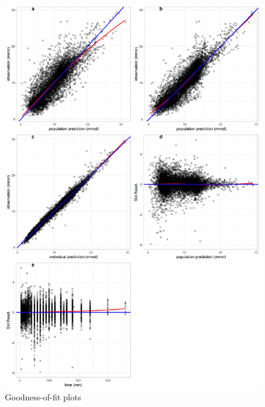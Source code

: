 \documentclass[utf8]{frontiersSCNS} %
\begin{document}
\begin{figure}[h!]
\begin{center}
\includegraphics[width=15cm]{comb.PNG}
\end{center}
\caption{Goodness-of-fit plots}
\label{fig: fittings}
\end{figure}
\end{document}
